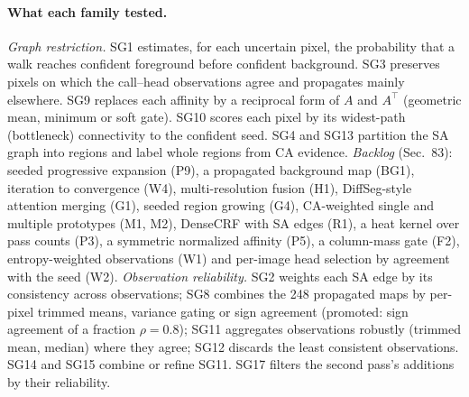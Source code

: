 \paragraph{What each family tested.}
\emph{Graph restriction.} SG1 estimates, for each uncertain pixel, the probability that a walk reaches confident foreground before confident background. SG3 preserves pixels on which the call--head observations agree and propagates mainly elsewhere. SG9 replaces each affinity by a reciprocal form of $A$ and $A^\top$ (geometric mean, minimum or soft gate). SG10 scores each pixel by its widest-path (bottleneck) connectivity to the confident seed. SG4 and SG13 partition the SA graph into regions and label whole regions from CA evidence. \emph{Backlog} (Sec.~83): seeded progressive expansion (P9), a propagated background map (BG1), iteration to convergence (W4), multi-resolution fusion (H1), DiffSeg-style attention merging (G1), seeded region growing (G4), CA-weighted single and multiple prototypes (M1, M2), DenseCRF with SA edges (R1), a heat kernel over pass counts (P3), a symmetric normalized affinity (P5), a column-mass gate (F2), entropy-weighted observations (W1) and per-image head selection by agreement with the seed (W2).
\emph{Observation reliability.} SG2 weights each SA edge by its consistency across observations; SG8 combines the 248 propagated maps by per-pixel trimmed means, variance gating or sign agreement (promoted: sign agreement of a fraction $\rho=0.8$); SG11 aggregates observations robustly (trimmed mean, median) where they agree; SG12 discards the least consistent observations. SG14 and SG15 combine or refine SG11. SG17 filters the second pass's additions by their reliability.
